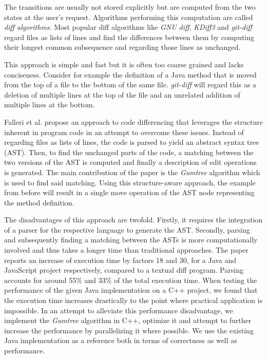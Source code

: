 \documentclass[letterpaper]{article}
\begin{document}
The transitions are usually not stored explicitly but are computed from the two states at the user's request.
Algorithms performing this computation are called \emph{diff algorithms}.
Most popular diff algorithms like \emph{GNU diff}, \emph{KDiff3} and \emph{git-diff} regard files as lists of lines and find the differences between them by computing their longest common subsequence and regarding those lines as unchanged.

This approach is simple and fast but it is often too coarse grained and lacks conciseness.
Consider for example the definition of a Java method that is moved from the top of a file to the bottom of the same file.
\emph{git-diff} will regard this as a deletion of multiple lines at the top of the file and an unrelated addition of multiple lines at the bottom.

Falleri et al. \cite{falleri:2014:structure_diff} propose an approach to code differencing that leverages the structure inherent in program code in an attempt to overcome these issues.
Instead of regarding files as lists of lines, the code is parsed to yield an abstract syntax tree (AST).
Then, to find the unchanged parts of the code, a matching between the two versions of the AST is computed and finally a description of edit operations is generated.
The main contribution of the paper is the \emph{Gumtree} algorithm which is used to find said matching.
Using this structure-aware approach, the example from before will result in a single move operation of the AST node representing the method definition.

The disadvantages of this approach are twofold.
Firstly, it requires the integration of a parser for the respective language to generate the AST.
Secondly, parsing and subsequently finding a matching between the ASTs is more computationally involved and thus takes a longer time than traditional approaches.
The paper reports an increase of execution time by factors 18 and 30, for a Java and JavaScript project respectively, compared to a textual diff program.
Parsing accounts for around 55\% and 33\% of the total execution time.
When testing the performance of the given Java implementation on a C++ project, we found that the execution time increases drastically to the point where practical application is impossible.
In an attempt to alleviate this performance disadvantage, we implement the \emph{Gumtree} algorithm in C++, optimize it and attempt to further increase the performance by parallelizing it where possible.
We use the existing Java implementation as a reference both in terms of correctness as well as performance.
\end{document}
